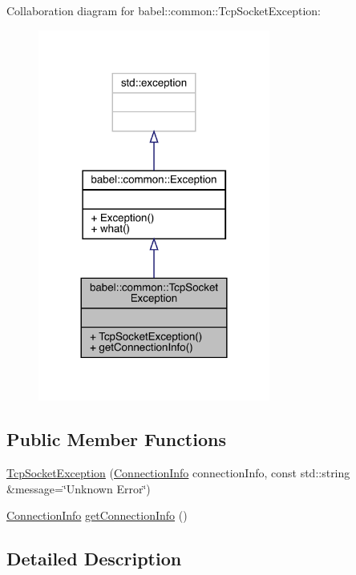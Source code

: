 Collaboration diagram for babel\+:\+:common\+:\+:Tcp\+Socket\+Exception\+:\nopagebreak
\begin{figure}[H]
\begin{center}
\leavevmode
\includegraphics[width=216pt]{classbabel_1_1common_1_1_tcp_socket_exception__coll__graph}
\end{center}
\end{figure}
\subsection*{Public Member Functions}
\begin{DoxyCompactItemize}
\item 
\mbox{\hyperlink{classbabel_1_1common_1_1_tcp_socket_exception_a6a24d1e9dc769afb2e4208f10f21f999}{Tcp\+Socket\+Exception}} (\mbox{\hyperlink{classbabel_1_1common_1_1_connection_info}{Connection\+Info}} connection\+Info, const std\+::string \&message=\char`\"{}Unknown Error\char`\"{})
\item 
\mbox{\hyperlink{classbabel_1_1common_1_1_connection_info}{Connection\+Info}} \mbox{\hyperlink{classbabel_1_1common_1_1_tcp_socket_exception_ac218f5271e7aab52dbf370be65d1e6af}{get\+Connection\+Info}} ()
\end{DoxyCompactItemize}


\subsection{Detailed Description}



